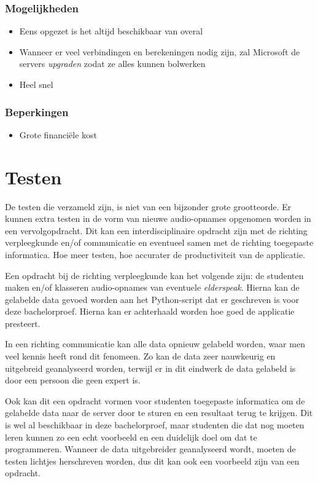 \subsubsection{Mogelijkheden}
\begin{itemize}
    \item Eens opgezet is het altijd beschikbaar van overal
    \item Wanneer er veel verbindingen en berekeningen nodig zijn, zal Microsoft de servers \textit{upgraden} zodat ze alles kunnen bolwerken
    \item Heel snel
\end{itemize}
\subsubsection{Beperkingen}
\begin{itemize}
    \item Grote financiële kost
\end{itemize}
\section{Testen}
De testen die verzameld zijn, is niet van een bijzonder grote grootteorde. Er kunnen extra testen in de vorm van nieuwe audio-opnames opgenomen worden in een vervolgopdracht. Dit kan een interdisciplinaire opdracht zijn met de richting verpleegkunde en/of communicatie en eventueel samen met de richting toegepaste informatica. Hoe meer testen, hoe accurater de productiviteit van de applicatie.

Een opdracht bij de richting verpleegkunde kan het volgende zijn: de studenten maken en/of klasseren audio-opnames van eventuele \textit{elderspeak}. Hierna kan de gelabelde data gevoed worden aan het Python-script dat er geschreven is voor deze bachelorproef. Hierna kan er achterhaald worden hoe goed de applicatie presteert.

In een richting communicatie kan alle data opnieuw gelabeld worden, waar men veel kennis heeft rond dit fenomeen. Zo kan de data zeer nauwkeurig en uitgebreid geanalyseerd worden, terwijl er in dit eindwerk de data gelabeld is door een persoon die geen expert is.

Ook kan dit een opdracht vormen voor studenten toegepaste informatica om de gelabelde data naar de server door te sturen en een resultaat terug te krijgen. Dit is wel al beschikbaar in deze bachelorproef, maar studenten die dat nog moeten leren kunnen zo een echt voorbeeld en een duidelijk doel om dat te programmeren. Wanneer de data uitgebreider geanalyseerd wordt, moeten de testen lichtjes herschreven worden, dus dit kan ook een voorbeeld zijn van een opdracht.

